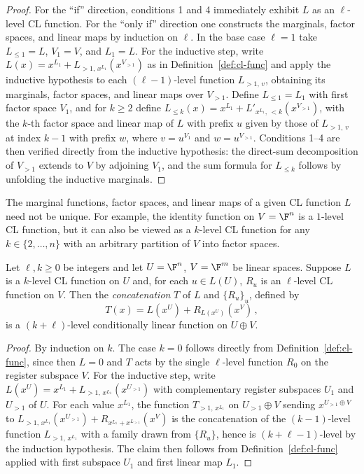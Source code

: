 \begin{proof}
	\leanok
	For the ``if'' direction, conditions 1 and 4 immediately exhibit $L$ as an $\ell$-level CL function. For the ``only if'' direction one constructs the marginals, factor spaces, and linear maps by induction on $\ell$. In the base case $\ell = 1$ take $L_{\le 1} = L$, $V_1 = V$, and $L_1 = L$. For the inductive step, write $L(x) = x^{L_1} + L_{>1,\,x^{L_1}}(x^{V_{>1}})$ as in Definition~\ref{def:cl-func} and apply the inductive hypothesis to each $(\ell-1)$-level function $L_{>1,\,v}$, obtaining its marginals, factor spaces, and linear maps over $V_{>1}$. Define $L_{\le 1} = L_1$ with first factor space $V_1$, and for $k \ge 2$ define $L_{\le k}(x) = x^{L_1} + L'_{x^{L_1},\,<k}(x^{V_{>1}})$, with the $k$-th factor space and linear map of $L$ with prefix $u$ given by those of $L_{>1,\,v}$ at index $k-1$ with prefix $w$, where $v = u^{V_1}$ and $w = u^{V_{>1}}$. Conditions 1--4 are then verified directly from the inductive hypothesis: the direct-sum decomposition of $V_{>1}$ extends to $V$ by adjoining $V_1$, and the sum formula for $L_{\le k}$ follows by unfolding the inductive marginals.
\end{proof}

The marginal functions, factor spaces, and linear maps of a given CL function $L$ need not be unique. For example, the identity function on $V = \F^n$ is a $1$-level CL function, but it can also be viewed as a $k$-level CL function for any $k \in \{2, \dots, n\}$ with an arbitrary partition of $V$ into factor spaces.

\begin{lemma}\label{lem:cl-concat}
	\leanok
	Let $\ell, k \ge 0$ be integers and let $U = \F^n$, $V = \F^m$ be linear spaces. Suppose $L$ is a $k$-level CL function on $U$ and, for each $u \in L(U)$, $R_u$ is an $\ell$-level CL function on $V$. Then the \emph{concatenation} $T$ of $L$ and $\{R_u\}_u$, defined by
	\[
		T(x) = L(x^U) + R_{L(x^U)}(x^V)\,,
	\]
	is a $(k+\ell)$-level conditionally linear function on $U \oplus V$.
\end{lemma}
\begin{proof}
	\leanok
	By induction on $k$. The case $k = 0$ follows directly from Definition~\ref{def:cl-func}, since then $L = 0$ and $T$ acts by the single $\ell$-level function $R_0$ on the register subspace $V$. For the inductive step, write $L(x^U) = x^{L_1} + L_{>1,\,x^{L_1}}(x^{U_{>1}})$ with complementary register subspaces $U_1$ and $U_{>1}$ of $U$. For each value $x^{L_1}$, the function $T_{>1,\,x^{L_1}}$ on $U_{>1} \oplus V$ sending $x^{U_{>1} \oplus V}$ to $L_{>1,\,x^{L_1}}(x^{U_{>1}}) + R_{x^{L_1} + x^{L_{>1}}}(x^V)$ is the concatenation of the $(k-1)$-level function $L_{>1,\,x^{L_1}}$ with a family drawn from $\{R_u\}$, hence is $(k+\ell-1)$-level by the induction hypothesis. The claim then follows from Definition~\ref{def:cl-func} applied with first subspace $U_1$ and first linear map $L_1$.
\end{proof}


